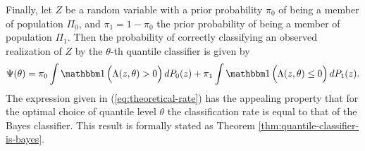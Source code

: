 Finally, let $Z$ be a random variable with a prior probability $\pi_0$ of being
a member of population $\Pi_0$, and $\pi_1 = 1 - \pi_0$ the prior probability of
being a member of population $\Pi_1$.  Then the probability of correctly
classifying an observed realization of $Z$ by the $\theta$-th quantile
classifier is given by
\begin{equation}
  \label{eq:theoretical-rate}
  \Psi(\theta) =
  \pi_0 \int \ind\Big( \Lambda(z, \theta) > 0 \Big)\, dP_0(z) +
  \pi_1 \int \ind\Big(\Lambda(z, \theta) \leq 0 \Big)\, dP_1(z).
\end{equation}
The expression given in (\ref{eq:theoretical-rate}) has the appealing property
that for the optimal choice of quantile level $\theta$ the classification rate
is equal to that of the Bayes classifier.  This result is formally stated as
Theorem \ref{thm:quantile-classifier-is-bayes}.

